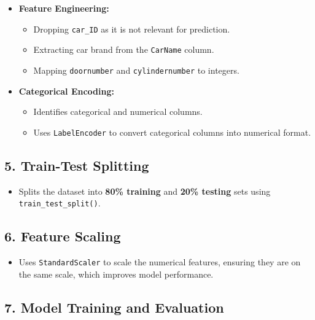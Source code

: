 \documentclass[journal]{IEEEtran}
\begin{document}
\begin{itemize}
    \item \textbf{Feature Engineering:}
    \begin{itemize}
        \item Dropping \texttt{car\_ID} as it is not relevant for prediction.
        \item Extracting car brand from the \texttt{CarName} column.
        \item Mapping \texttt{doornumber} and \texttt{cylindernumber} to integers.
    \end{itemize}
    \item \textbf{Categorical Encoding:}
    \begin{itemize}
        \item Identifies categorical and numerical columns.
        \item Uses \texttt{LabelEncoder} to convert categorical columns into numerical format.
    \end{itemize}
\end{itemize}

\subsection{5. Train-Test Splitting}

\begin{itemize}
    \item Splits the dataset into \textbf{80\% training} and \textbf{20\% testing} sets using \texttt{train\_test\_split()}.
\end{itemize}

\subsection{6. Feature Scaling}

\begin{itemize}
    \item Uses \texttt{StandardScaler} to scale the numerical features, ensuring they are on the same scale, which improves model performance.
\end{itemize}

\subsection{7. Model Training and Evaluation}
\end{document}
